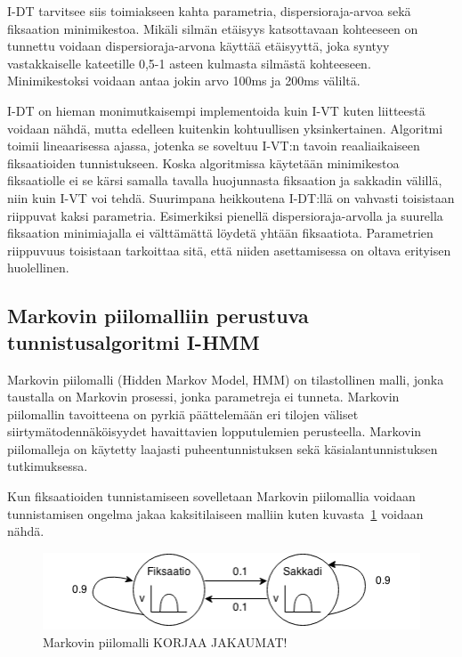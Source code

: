 I-DT tarvitsee siis toimiakseen kahta parametria, dispersioraja-arvoa sekä fiksaation minimikestoa. Mikäli silmän etäisyys katsottavaan kohteeseen on tunnettu voidaan dispersioraja-arvona käyttää etäisyyttä, joka syntyy vastakkaiselle kateetille 0,5-1 asteen kulmasta silmästä kohteeseen. Minimikestoksi voidaan antaa jokin arvo 100ms ja 200ms väliltä. \citep[s. 74]{salvucci2000}

I-DT on hieman monimutkaisempi implementoida kuin I-VT kuten liitteestä \emph{} voidaan nähdä, mutta edelleen kuitenkin kohtuullisen yksinkertainen. Algoritmi toimii lineaarisessa ajassa, jotenka se soveltuu I-VT:n tavoin reaaliaikaiseen fiksaatioiden tunnistukseen. Koska algoritmissa käytetään minimikestoa fiksaatiolle ei se kärsi samalla tavalla huojunnasta fiksaation ja sakkadin välillä, niin kuin I-VT voi tehdä. Suurimpana heikkoutena I-DT:llä on vahvasti toisistaan riippuvat kaksi parametria. Esimerkiksi pienellä dispersioraja-arvolla ja suurella fiksaation minimiajalla ei välttämättä löydetä yhtään fiksaatiota. Parametrien riippuvuus toisistaan tarkoittaa sitä, että niiden asettamisessa on oltava erityisen huolellinen.


\subsection{Markovin piilomalliin perustuva tunnistusalgoritmi I-HMM}

Markovin piilomalli (Hidden Markov Model, HMM) on tilastollinen malli, jonka taustalla on Markovin prosessi, jonka parametreja ei tunneta. Markovin piilomallin tavoitteena on pyrkiä päättelemään eri tilojen väliset siirtymätodennäköisyydet havaittavien lopputulemien perusteella. Markovin piilomalleja on käytetty laajasti puheentunnistuksen sekä käsialantunnistuksen tutkimuksessa.\citep[s. 257-286]{rabiner1989tutorial}

Kun fiksaatioiden tunnistamiseen sovelletaan Markovin piilomallia voidaan tunnistamisen ongelma jakaa kaksitilaiseen malliin kuten kuvasta~\ref{fig:hmm_sample} voidaan nähdä. 

\begin{figure}[h]
    \includegraphics[width=1.0\textwidth]{HMM.png}
		\caption{Markovin piilomalli KORJAA JAKAUMAT!}
		\label{fig:hmm_sample}
\end{figure}

